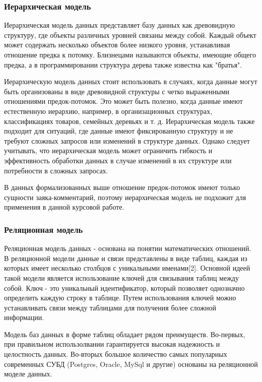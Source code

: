 \subsubsection{Иерархическая модель}

Иерархическая модель данных представляет базу данных как древовидную структуру, где объекты различных уровней связаны между собой. Каждый объект может содержать несколько объектов более низкого уровня, устанавливая отношение предка к потомку. Близнецами называются объекты, имеющие общего предка, а в программировании структура дерева также известна как "братья".

Иерархическую модель данных стоит использовать в случаях, когда данные могут быть организованы в виде древовидной структуры с четко выраженными отношениями предок-потомок. Это может быть полезно, когда данные имеют естественную иерархию, например, в организационных структурах, классификациях товаров, семейных деревьях и т. д. Иерархическая модель также подходит для ситуаций, где данные имеют фиксированную структуру и не требуют сложных запросов или изменений в структуре данных. Однако следует учитывать, что иерархическая модель может ограничить гибкость и эффективность обработки данных в случае изменений в их структуре или потребности в сложных запросах. 

В данных формализованных выше отношение предок-потомок имеют только сущности заяка-комментарий, поэтому иерархическая модель не подхожит для применения в данной курсовой работе.

\subsubsection{Реляционная модель}

Реляционная модель данных - основана на понятии математических отношений. В реляционной модели данные и связи представлены в виде таблиц, каждая из которых имеет несколько столбцов с уникальными именами[2]. Основной идеей такой модели является использование ключей для связывания таблиц между собой. Ключ - это уникальный идентификатор, который позволяет однозначно определить каждую строку в таблице. Путем использования ключей можно устанавливать связи между таблицами для получения более сложной информации.

Модель баз данных в форме таблиц обладает рядом преимуществ. Во-первых, при правильном использолвании гарантируется высокая надежность и целостность данных. Во-вторых большое количество самых популарных современных СУБД (Postgres, Oracle, MySql и другие) основаны на реляционной моделе данных.


